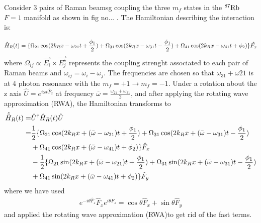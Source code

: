 
Consider 3 pairs of Raman beamsg coupling the three $m_f$ states in the $\Rb87$ $F=1$ manifold as shown in fig no... . The Hamiltonian describing the interaction is: 

%
\begin{align}
\hat{H}_R(t) = \lbrace\Omega_{21}\cos(2{{k_R}} x-\omega_{21} t +\frac{\phi_1}{2})+\Omega_{31}\cos(2{{k_R}} x-\omega_{31} t-\frac{\phi_1}{2})+\Omega_{41}\cos(2{{k_R}} x-\omega_{41} t + \phi_2)\rbrace\hat{F_x}
\end{align}
%
%
where $\Omega_{ij}\propto \vec{E_i}\times\vec{E_j^{\star}}$ represents the coupling strenght associated to each pair of Raman beams and $\omega_{ij} = \omega_{i}-\omega_{j} $. The frequencies are chosen so that $\omega_{31} + \omega{21}$ is at 4 photon resonance with the $m_f = +1\rightarrow m_f = -1$. Under a rotation about the z axis $\hat{U} = e^{i\omega t\hat{F}_z}$ at frequency $\bar{\omega} = \frac{\omega_{21}+\omega_{31}}{2}$, and after applying the rotating wave approximation (RWA), the Hamiltonian transforms to 
%
%
\begin{align}
\begin{split}
\hat{\tilde{H}}_R(t) = & \hat{U}^{\dagger} \hat{H}_R(t)\hat{U} \\
                     = & \frac{1}{2}\lbrace\Omega_{21}\cos(2{{k_R}} x+(\bar{\omega}-\omega_{21}) t +\frac{\phi_1}{2})+\Omega_{31}\cos(2{{k_R}} x+(\bar{\omega}-\omega_{31}) t -\frac{\phi_1}{2}) \\
                     & +\Omega_{41}\cos(2{{k_R}} x+(\bar{\omega}-\omega_{41}) t + \phi_2)\rbrace \hat{F}_x \\
					& -  \frac{1}{2}\lbrace\Omega_{21}\sin(2{{k_R}} x+(\bar{\omega}-\omega_{21}) t +\frac{\phi_1}{2})+\Omega_{31}\sin(2{{k_R}} x+(\bar{\omega}-\omega_{31}) t-\frac{\phi_1}{2})\\
					&+\Omega_{41}\sin(2{{k_R}} x+(\bar{\omega}-\omega_{41}) t+\phi_2)\rbrace \hat{F}_y
\end{split}
\end{align}
%
%
where we have used 
%
\begin{align}
e^{-i\theta \hat{F}_z} \hat{F}_x e^{i\theta \hat{F}_z}= \cos\theta \hat{F}_x + \sin\theta\hat{F}_y
\end{align}
%
and applied the rotating wave approximation (RWA)to get rid of the fast terms. 

